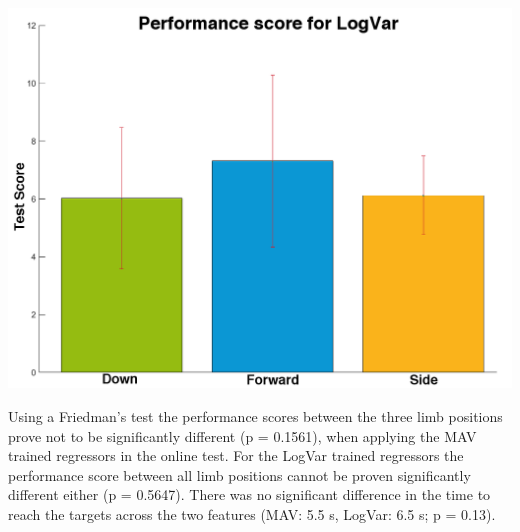 \documentclass[landscape,a0paper,fontscale=0.375]{baposter} %
\begin{document}
\begin{poster}
{\vspace{-0.6cm}
\begin{center}
	\includegraphics[width=0.7\linewidth]{gotItLogVar}
\end{center}
	
Using a Friedman's test the performance scores between the three limb positions prove not to be significantly different (p = 0.1561), when applying the MAV trained regressors in the online test. For the LogVar trained regressors the performance score between all limb positions cannot be proven significantly different either (p = 0.5647). There was no significant difference in the time to reach the targets across the two features (MAV: 5.5 s, LogVar: 6.5 s; p = 0.13).

}


\end{poster}
\end{document}
